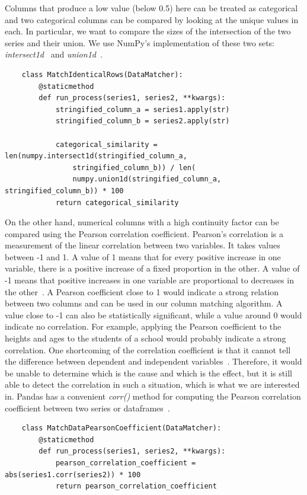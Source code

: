 Columns that produce a low value (below 0.5) here can be treated as categorical and two categorical columns can be
compared by looking at the unique values in each.
In particular, we want to compare the sizes of the intersection of the two series and their union.
We use NumPy's implementation of these two sets: \textit{intersect1d}~\cite{numpyIntersect1d} and
\textit{union1d}~\cite{numpyUnion1d}.

\begin{verbatim}
    class MatchIdenticalRows(DataMatcher):
        @staticmethod
        def run_process(series1, series2, **kwargs):
            stringified_column_a = series1.apply(str)
            stringified_column_b = series2.apply(str)

            categorical_similarity = len(numpy.intersect1d(stringified_column_a,
                stringified_column_b)) / len(
                numpy.union1d(stringified_column_a, stringified_column_b)) * 100
            return categorical_similarity
\end{verbatim}

On the other hand, numerical columns with a high continuity factor can be compared using the Pearson correlation
coefficient.
Pearson's correlation is a measurement of the linear correlation between two variables.
It takes values between -1 and 1.
A value of 1 means that for every positive increase in one variable, there is a positive increase of a fixed proportion
in the other.
A value of -1 means that positive increases in one variable are proportional to decreases
in the other~\cite{PearsonCorrelationCoefficient}.
A Pearson coefficient close to 1 would indicate a strong relation between two columns and can be used in our column
matching algorithm.
A value close to -1 can also be statistically significant, while a value around 0 would indicate no correlation.
For example, applying the Pearson coefficient to the heights and ages to the students of a school would probably indicate
a strong correlation.
One shortcoming of the correlation coefficient is that it cannot tell the difference between dependent and
independent variables~\cite{PearsonCorrelationCoefficient}.
Therefore, it would be unable to determine which is the cause and which is the effect, but it is still able to detect the
correlation in such a situation, which is what we are interested in.
Pandas has a convenient \textit{corr()} method for computing the Pearson correlation coefficient between two series or
dataframes~\cite{pandasCorr}.

\begin{verbatim}
    class MatchDataPearsonCoefficient(DataMatcher):
        @staticmethod
        def run_process(series1, series2, **kwargs):
            pearson_correlation_coefficient = abs(series1.corr(series2)) * 100
            return pearson_correlation_coefficient
\end{verbatim}

